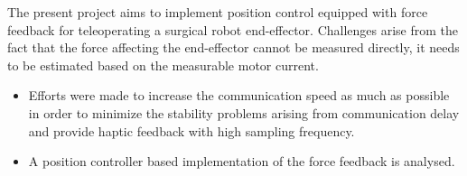 The present project aims to implement position control equipped with force feedback for teleoperating a surgical robot end-effector. %
Challenges arise from the fact that the force affecting the end-effector cannot be measured directly, it needs to be estimated based on the measurable motor current.
\begin{itemize}
	
	\item Efforts were made to increase the communication speed as much as possible in order to minimize the stability problems arising from communication delay and provide haptic feedback with high sampling frequency.
\item A position controller based implementation of the force feedback is analysed.
\end{itemize} 